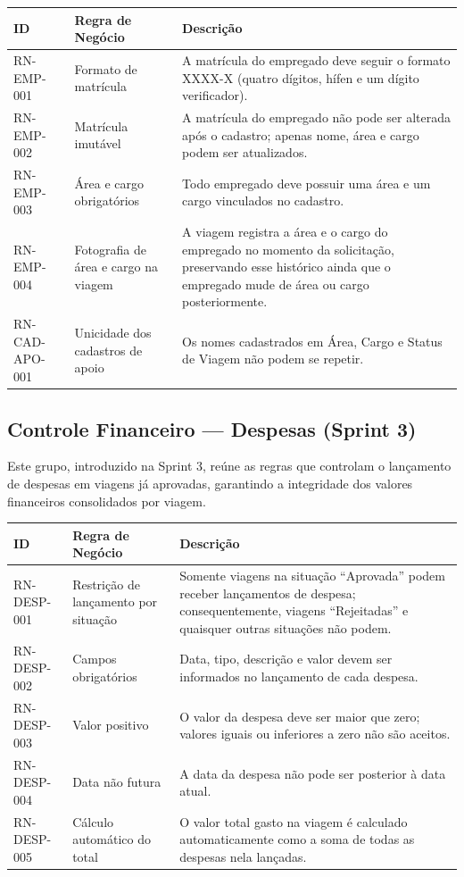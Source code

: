 \documentclass[12pt,article,oneside,a4paper]{abntex2}
\begin{document}
\begin{xltabular}{\textwidth}{|l|l|Y|}
\hline
{}
\textbf{ID} & \textbf{Regra de Negócio} & \textbf{Descrição} \\
\hline
\endhead
RN-EMP-001 & Formato de matrícula & A matrícula do empregado deve seguir o formato XXXX-X (quatro dígitos, hífen e um dígito verificador). \\
\hline
RN-EMP-002 & Matrícula imutável & A matrícula do empregado não pode ser alterada após o cadastro; apenas nome, área e cargo podem ser atualizados. \\
\hline
RN-EMP-003 & Área e cargo obrigatórios & Todo empregado deve possuir uma área e um cargo vinculados no cadastro. \\
\hline
RN-EMP-004 & Fotografia de área e cargo na viagem & A viagem registra a área e o cargo do empregado no momento da solicitação, preservando esse histórico ainda que o empregado mude de área ou cargo posteriormente. \\
\hline
RN-CAD-APO-001 & Unicidade dos cadastros de apoio & Os nomes cadastrados em Área, Cargo e Status de Viagem não podem se repetir. \\
\hline
\end{xltabular}

\bigskip

\subsection{Controle Financeiro --- Despesas (Sprint 3)}

Este grupo, introduzido na Sprint 3, reúne as regras que controlam o
lançamento de despesas em viagens já aprovadas, garantindo a integridade dos
valores financeiros consolidados por viagem.

\begin{xltabular}{\textwidth}{|l|l|Y|}
\hline
{}
\textbf{ID} & \textbf{Regra de Negócio} & \textbf{Descrição} \\
\hline
\endhead
RN-DESP-001 & Restrição de lançamento por situação & Somente viagens na situação ``Aprovada'' podem receber lançamentos de despesa; consequentemente, viagens ``Rejeitadas'' e quaisquer outras situações não podem. \\
\hline
RN-DESP-002 & Campos obrigatórios & Data, tipo, descrição e valor devem ser informados no lançamento de cada despesa. \\
\hline
RN-DESP-003 & Valor positivo & O valor da despesa deve ser maior que zero; valores iguais ou inferiores a zero não são aceitos. \\
\hline
RN-DESP-004 & Data não futura & A data da despesa não pode ser posterior à data atual. \\
\hline
RN-DESP-005 & Cálculo automático do total & O valor total gasto na viagem é calculado automaticamente como a soma de todas as despesas nela lançadas. \\
\hline
\end{xltabular}
\end{document}
